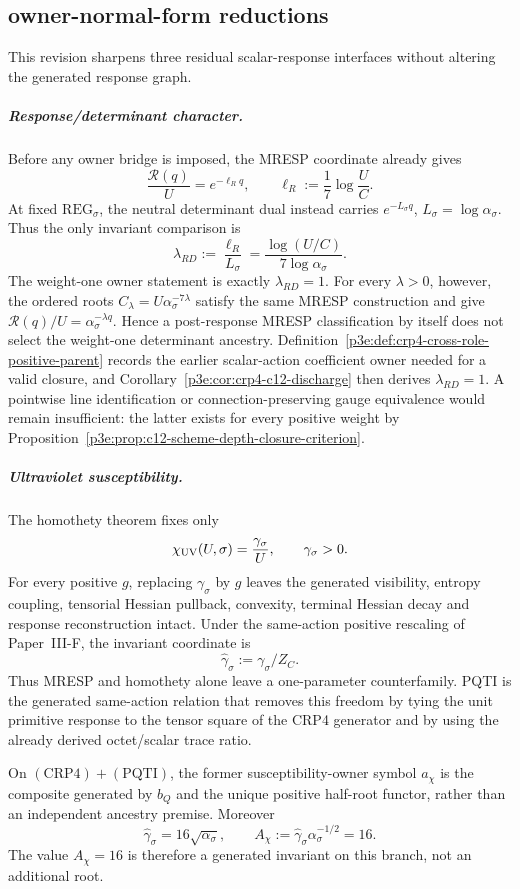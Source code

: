 \documentclass[12pt,a4paper]{article}
\begin{document}
\subsection{owner-normal-form reductions}
\label{p3e:sec:post-v125-owner-normal-forms}

This revision sharpens three residual scalar-response interfaces without
altering the generated response graph.

\subparagraph{Response/determinant character.}
Before any owner bridge is imposed, the MRESP coordinate already gives
\[
 \frac{\mathcal R(q)}{U}=e^{-\ell_R q},\qquad
 \ell_R:=\frac1{7}\log\frac{U}{C}.
\]
At fixed $\mathrm{REG}_\sigma$, the neutral determinant dual instead carries
$e^{-L_\sigma q}$, $L_\sigma=\log\alpha_\sigma$.  Thus the only invariant
comparison is
\[
 \lambda_{RD}:=\frac{\ell_R}{L_\sigma}
 =\frac{\log(U/C)}{7\log\alpha_\sigma}.
\]
The weight-one owner statement is exactly $\lambda_{RD}=1$.  For every
$\lambda>0$, however, the ordered roots
$C_\lambda=U\alpha_\sigma^{-7\lambda}$ satisfy the same MRESP construction and
give $\mathcal R(q)/U=\alpha_\sigma^{-\lambda q}$.  Hence a post-response
MRESP classification by itself does not select the weight-one determinant
ancestry.  Definition~\ref{p3e:def:crp4-cross-role-positive-parent} records
the earlier scalar-action coefficient owner needed for a valid closure, and
Corollary~\ref{p3e:cor:crp4-c12-discharge} then derives \(\lambda_{RD}=1\).
A pointwise line identification or connection-preserving gauge equivalence
would remain insufficient: the latter exists for every positive weight by
Proposition~\ref{p3e:prop:c12-scheme-depth-closure-criterion}.

\subparagraph{Ultraviolet susceptibility.}
The homothety theorem fixes only
\[
 \chi_{\rm UV}(U,\sigma)=\frac{\gamma_\sigma}{U},\qquad \gamma_\sigma>0.
\]
For every positive $g$, replacing $\gamma_\sigma$ by $g$ leaves the generated
visibility, entropy coupling, tensorial Hessian pullback, convexity, terminal
Hessian decay and response reconstruction intact.  Under the same-action
positive rescaling of Paper~III-F, the invariant coordinate is
\[
 \widehat\gamma_\sigma:=\gamma_\sigma/Z_C.
\]
Thus MRESP and homothety alone leave a one-parameter counterfamily.  PQTI is
the generated same-action relation that removes this freedom by tying the
unit primitive response to the tensor square of the CRP4 generator and by
using the already derived octet/scalar trace ratio.

\begin{proposition}
\label{p3e:prop:conditional-susceptibility-half-weight}
On \((\mathrm{CRP4})+(\mathrm{PQTI})\), the former susceptibility-owner
symbol \(a_\chi\) is the composite generated by \(b_Q\) and the unique
positive half-root functor, rather than an independent ancestry premise.
Moreover
\[
 \boxed{\widehat\gamma_\sigma
       =16\sqrt{\alpha_\sigma},\qquad
 A_\chi:=\widehat\gamma_\sigma\alpha_\sigma^{-1/2}
       =16.}
\]
The value \(A_\chi=16\) is therefore a generated invariant on this branch,
not an additional root.
\end{proposition}
\end{document}
